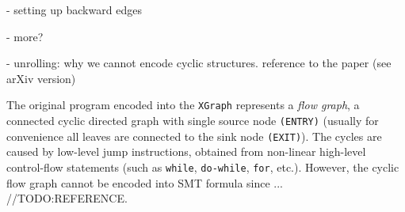 - setting up backward edges

- more?

- unrolling: why we cannot encode cyclic structures. reference to the paper (see arXiv version)

The original program encoded into the \texttt{XGraph} represents a \textit{flow graph}, a connected cyclic directed graph with single source node \texttt{(ENTRY)} (usually for convenience all leaves are connected to the sink node \texttt{(EXIT)}). The cycles are caused by low-level jump instructions, obtained from non-linear high-level control-flow statements (such as \texttt{while}, \texttt{do-while}, \texttt{for}, etc.). However, the cyclic flow graph cannot be encoded into SMT formula since ...
//TODO:REFERENCE.%




